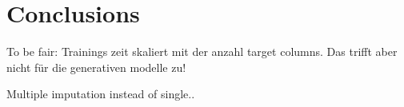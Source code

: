\section{Conclusions}
\label{sec:conclusion}
To be fair: Trainings zeit skaliert mit der anzahl target columns. Das trifft aber nicht für die generativen modelle zu!

Multiple imputation instead of single..
